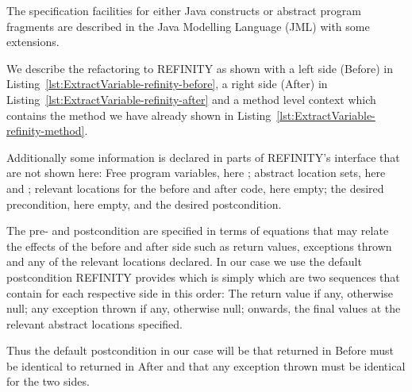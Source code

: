 The specification facilities for either Java constructs or abstract program fragments are described in the Java Modelling Language (JML) with some extensions.

We describe the refactoring to REFINITY as shown with a left side (Before) in Listing~\ref{lst:ExtractVariable-refinity-before},
a right side (After) in Listing~\ref{lst:ExtractVariable-refinity-after} and a method level context which contains the method we have already shown in Listing~\ref{lst:ExtractVariable-refinity-method}.

Additionally some information is declared in parts of REFINITY's interface that are not shown here:
Free program variables, here ; abstract location sets, here  and ; relevant locations for the before and after code, here empty;
the desired precondition, here empty, and the desired postcondition.

The pre- and postcondition are specified in terms of equations that may relate the effects of the before and after side such as return values, exceptions thrown and any of the relevant locations declared.
In our case we use the default postcondition REFINITY provides which is simply  which are two sequences that contain for each respective side in this order:
The return value if any, otherwise null; any exception thrown if any, otherwise null; onwards, the final values at the relevant abstract locations specified.

Thus the default postcondition in our case will be that  returned in Before must be identical to  returned in After and that any exception thrown must be identical for the two sides.


